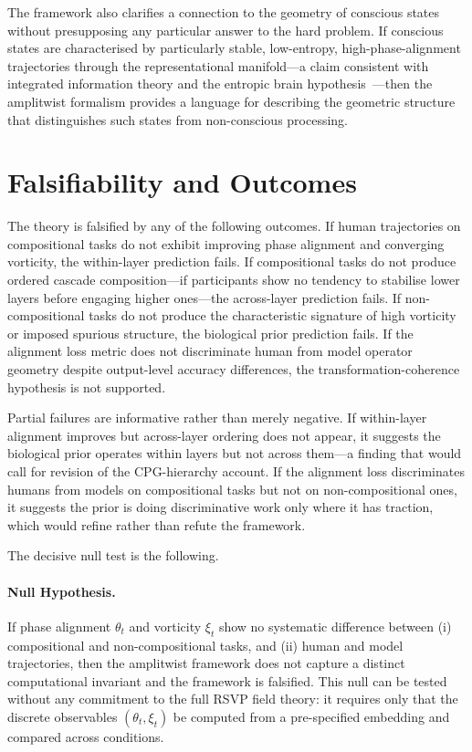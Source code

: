 \documentclass[12pt, a4paper]{article}
\theoremstyle{remark}
\theoremstyle{definition}
\begin{document}
The framework also clarifies a connection to the geometry of conscious states without
presupposing any particular answer to the hard problem.  If conscious states are
characterised by particularly stable, low-entropy, high-phase-alignment trajectories
through the representational manifold---a claim consistent with integrated information
theory and the entropic brain hypothesis~\cite{tononi2008consciousness,carhart2014entropic}---then the amplitwist formalism provides a
language for describing the geometric structure that distinguishes such states from
non-conscious processing.

\section{Falsifiability and Outcomes}
\label{sec:falsifiability}

The theory is falsified by any of the following outcomes.  If human trajectories on
compositional tasks do not exhibit improving phase alignment and converging vorticity, the
within-layer prediction fails.  If compositional tasks do not produce ordered cascade
composition---if participants show no tendency to stabilise lower layers before engaging
higher ones---the across-layer prediction fails.  If non-compositional tasks do not produce
the characteristic signature of high vorticity or imposed spurious structure, the
biological prior prediction fails.  If the alignment loss metric does not discriminate
human from model operator geometry despite output-level accuracy differences, the
transformation-coherence hypothesis is not supported.

Partial failures are informative rather than merely negative.  If within-layer alignment
improves but across-layer ordering does not appear, it suggests the biological prior
operates within layers but not across them---a finding that would call for revision of the
CPG-hierarchy account.  If the alignment loss discriminates humans from models on
compositional tasks but not on non-compositional ones, it suggests the prior is doing
discriminative work only where it has traction, which would refine rather than refute the
framework.

The decisive null test is the following.

\paragraph{Null Hypothesis.} If phase alignment $\theta_t$ and vorticity $\xi_t$ show no
systematic difference between (i) compositional and non-compositional tasks, and (ii)
human and model trajectories, then the amplitwist framework does not capture a distinct
computational invariant and the framework is falsified.  This null can be tested without
any commitment to the full RSVP field theory: it requires only that the discrete
observables $(\theta_t, \xi_t)$ be computed from a pre-specified embedding and compared
across conditions.
\end{document}
